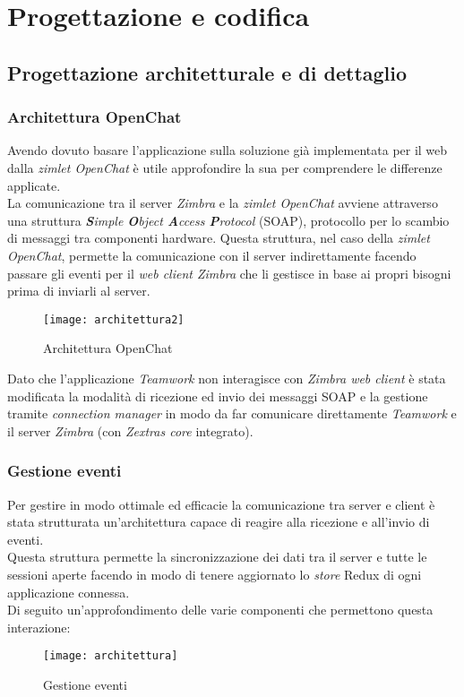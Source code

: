 \chapter{Progettazione e codifica }\label{chap:design}

\section {Progettazione architetturale e di dettaglio}
\subsection{Architettura OpenChat}
Avendo dovuto basare l'applicazione sulla soluzione già implementata per il web dalla \emph{zimlet OpenChat} è utile approfondire la sua  per comprendere le differenze applicate. \\
La comunicazione tra il server \emph{Zimbra} e la \emph{zimlet OpenChat} avviene attraverso una struttura \emph{\textbf{S}imple \textbf{O}bject \textbf{A}ccess \textbf{P}rotocol} (\acrshort{SOAP}), protocollo per lo scambio di messaggi tra componenti hardware.
Questa struttura, nel caso della \emph{zimlet OpenChat}, permette la comunicazione con il server indirettamente facendo passare gli eventi per il \emph{web client Zimbra} che li gestisce in base ai propri bisogni prima di inviarli al server. \\
\begin{figure}[H] 
	\centering
	\texttt{[image: architettura2]}
	\caption{Architettura OpenChat}
\end{figure}
Dato che l'applicazione \emph{Teamwork} non interagisce con \emph{Zimbra web client} è stata modificata la modalità di ricezione ed invio dei messaggi SOAP e la gestione tramite \emph{connection manager} in modo da far comunicare direttamente \emph{Teamwork} e il server \emph{Zimbra} (con \emph{Zextras core} integrato).

\subsection{Gestione eventi}
Per gestire in modo ottimale ed efficacie la comunicazione tra server e client è stata strutturata un'architettura capace di reagire alla ricezione e all'invio di eventi. \\
Questa struttura permette la sincronizzazione dei dati tra il server e tutte le sessioni aperte facendo in modo di tenere aggiornato lo \emph{store} Redux di ogni applicazione connessa.\\
Di seguito un'approfondimento delle varie componenti che permettono questa interazione:
\begin{figure}[H] 
	\centering
	\texttt{[image: architettura]}
	\caption{Gestione eventi}
\end{figure}
